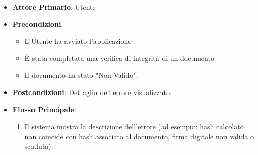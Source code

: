 \begin{itemize}
    \item \textbf{Attore Primario}: Utente
    \item \textbf{Precondizioni}: 
        \begin{itemize}
            \item L'Utente ha avviato l'applicazione
            \item È stata completata una verifica di integrità di un documento
            \item Il documento ha stato "Non Valido".
        \end{itemize} 
    \item \textbf{Postcondizioni}: Dettaglio dell'errore visualizzato.     
    \item \textbf{Flusso Principale}:
        \begin{enumerate}
            \item Il sistema mostra la descrizione dell'errore (ad esempio: hash calcolato non coincide con hash associato al documento, firma digitale non valida o scaduta).
        \end{enumerate}
\end{itemize}

